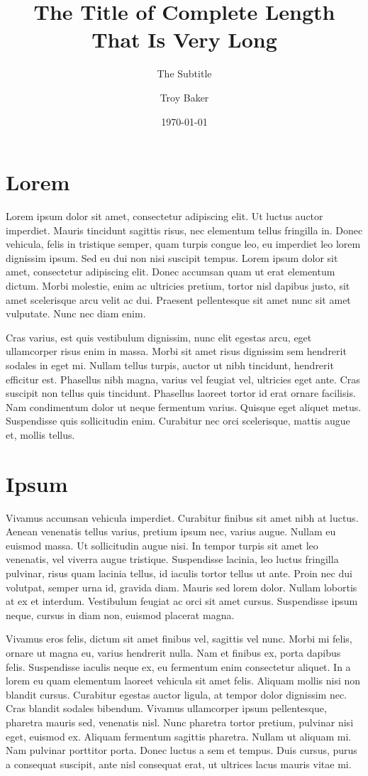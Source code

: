 \documentclass{myCompactDoc}
\title[The Short Title]{The Title of Complete Length That Is Very Long}
\subtitle{The Subtitle} %
\author{Troy Baker}
\date{\today}
\begin{document}
\makeTitle


\section{Lorem}
Lorem ipsum dolor sit amet, consectetur adipiscing elit. Ut luctus auctor imperdiet. Mauris tincidunt sagittis risus, nec elementum tellus fringilla in. Donec vehicula, felis in tristique semper, quam turpis congue leo, eu imperdiet leo lorem dignissim ipsum. Sed eu dui non nisi suscipit tempus. Lorem ipsum dolor sit amet, consectetur adipiscing elit. Donec accumsan quam ut erat elementum dictum. Morbi molestie, enim ac ultricies pretium, tortor nisl dapibus justo, sit amet scelerisque arcu velit ac dui. Praesent pellentesque sit amet nunc sit amet vulputate. Nunc nec diam enim.

Cras varius, est quis vestibulum dignissim, nunc elit egestas arcu, eget ullamcorper risus enim in massa. Morbi sit amet risus dignissim sem hendrerit sodales in eget mi. Nullam tellus turpis, auctor ut nibh tincidunt, hendrerit efficitur est. Phasellus nibh magna, varius vel feugiat vel, ultricies eget ante. Cras suscipit non tellus quis tincidunt. Phasellus laoreet tortor id erat ornare facilisis. Nam condimentum dolor ut neque fermentum varius. Quisque eget aliquet metus. Suspendisse quis sollicitudin enim. Curabitur nec orci scelerisque, mattis augue et, mollis tellus.

\section{Ipsum}
Vivamus accumsan vehicula imperdiet. Curabitur finibus sit amet nibh at luctus. Aenean venenatis tellus varius, pretium ipsum nec, varius augue. Nullam eu euismod massa. Ut sollicitudin augue nisi. In tempor turpis sit amet leo venenatis, vel viverra augue tristique. Suspendisse lacinia, leo luctus fringilla pulvinar, risus quam lacinia tellus, id iaculis tortor tellus ut ante. Proin nec dui volutpat, semper urna id, gravida diam. Mauris sed lorem dolor. Nullam lobortis at ex et interdum. Vestibulum feugiat ac orci sit amet cursus. Suspendisse ipsum neque, cursus in diam non, euismod placerat magna.

Vivamus eros felis, dictum sit amet finibus vel, sagittis vel nunc. Morbi mi felis, ornare ut magna eu, varius hendrerit nulla. Nam et finibus ex, porta dapibus felis. Suspendisse iaculis neque ex, eu fermentum enim consectetur aliquet. In a lorem eu quam elementum laoreet vehicula sit amet felis. Aliquam mollis nisi non blandit cursus. Curabitur egestas auctor ligula, at tempor dolor dignissim nec. Cras blandit sodales bibendum. Vivamus ullamcorper ipsum pellentesque, pharetra mauris sed, venenatis nisl. Nunc pharetra tortor pretium, pulvinar nisi eget, euismod ex. Aliquam fermentum sagittis pharetra. Nullam ut aliquam mi. Nam pulvinar porttitor porta. Donec luctus a sem et tempus. Duis cursus, purus a consequat suscipit, ante nisl consequat erat, ut ultrices lacus mauris vitae mi.
\end{document}
